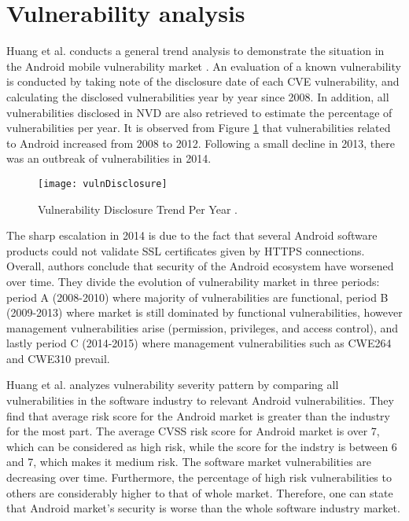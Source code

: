 \documentclass[
  a4paper,  %
  twoside,  %
  bibliography=totoc,
  headsepline,
  cleardoublepage=empty,
  parskip=half,
  draft=false,
  open=any
]{scrbook}
\begin{document}
\section{Vulnerability analysis}
Huang et al. conducts a general trend analysis to demonstrate the situation in the Android mobile vulnerability market \cite{huang2015}. An evaluation of a known vulnerability is conducted by taking note of the disclosure date of each CVE vulnerability, and calculating the disclosed vulnerabilities year by year since 2008. In addition, all vulnerabilities disclosed in NVD are also retrieved to estimate the percentage of vulnerabilities per year. It is observed from Figure \ref{vuln-disc} that vulnerabilities related to Android increased from 2008 to 2012. Following a small decline in 2013, there was an outbreak of vulnerabilities in 2014.
\begin{figure}\centering
	\texttt{[image: vulnDisclosure]}
	\caption{Vulnerability Disclosure Trend Per Year \cite{huang2015}.}
	\label{vuln-disc}
\end{figure}
The sharp escalation in 2014 is due to the fact that several Android software products could not validate SSL certificates given by HTTPS connections. Overall, authors conclude that security of the Android ecosystem have worsened over time. They divide the evolution of vulnerability market in three periods: period A (2008-2010) where majority of vulnerabilities are functional, period B (2009-2013) where market is still dominated by functional vulnerabilities, however management vulnerabilities arise (permission, privileges, and access control), and lastly period C (2014-2015) where management vulnerabilities such as CWE264 and CWE310 prevail.

Huang et al. analyzes vulnerability severity pattern by comparing all vulnerabilities in the software industry to relevant Android vulnerabilities. They find that average risk score for the Android market is greater than the industry for the most part. The average CVSS risk score for Android market is over 7, which can be considered as high risk, while the score for the indstry is between 6 and 7, which makes it medium risk. The software market vulnerabilities are decreasing over time. Furthermore, the percentage of high risk vulnerabilities to others are considerably higher to that of whole market. Therefore, one can state that Android market's security is worse than the whole software industry market.
\end{document}
